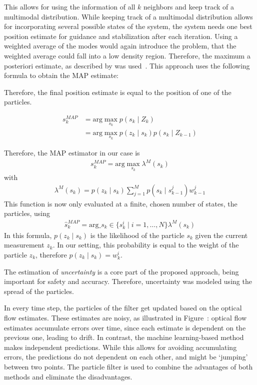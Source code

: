 \documentclass{report}
\begin{document}
This allows for using the information of all $k$ neighbors and keep
track of a multimodal distribution. While keeping track of a
multimodal distribution allows for incorporating several possible
states of the system, the system needs one best position estimate for
guidance and stabilization after each iteration. Using a weighted
average of the modes would again introduce the problem, that the
weighted average could fall into a low density region. Therefore, the
maximum a posteriori estimate, as described by
\citeauthor{driessen2008map} was used~\cite{driessen2008map}. This
approach uses the following formula to obtain the MAP estimate:

Therefore, the final position estimate is equal to the position of one
of the particles.

\begin{align}
  s_k^{MAP}  &= \text{arg}\max_{s_k}{p(s_k \mid Z_k)}\\
             &= \text{arg}\max_{s_k}{p(z_k \mid s_k) p(s_k \mid Z_{k-1})} 
\end{align}

Therefore, the MAP estimator in our case is
\begin{align}
s_k^{MAP} = \text{arg}\max_{s_k} \lambda^M(s_k)
\end{align}
with
\begin{align}
\lambda^M(s_k) = p(z_k \mid s_k) \sum_{j=1}^Mp(s_k \mid s_{k-1}^j)w^j_{k-1}
\end{align}
This function is now only evaluated at a finite, chosen number of
states, the particles, using
\begin{align}
\hat{s}_k^{MAP} = \text{arg}\_{s_k \in \{s_k^i \mid i=1,\ldots,N\}} \lambda^M(s_k)
\end{align}
In this formula, $p(z_k \mid s_k)$ is the likelihood of the particle
$s_k$ given the current measurement $z_k$. In our setting, this
probability is equal to the weight of the particle $z_k$, therefore
$p(z_k \mid s_k) = w^i_k$.

The estimation of \emph{uncertainty} is a core part of the proposed
approach, being important for safety and accuracy. Therefore,
uncertainty was modeled using the spread of the particles.

In every time step, the particles of the filter get updated based on
the optical flow estimates. These estimates are noisy, as illustrated
in Figure~: optical
flow estimates accumulate errors over time, since each estimate is
dependent on the previous one, leading to drift. In contrast, the
machine learning-based method makes independent predictions. While
this allows for avoiding accumulating errors, the predictions do not
dependent on each other, and might be `jumping' between two
points. The particle filter is used to combine the advantages of both
methods and eliminate the disadvantages.
\end{document}
